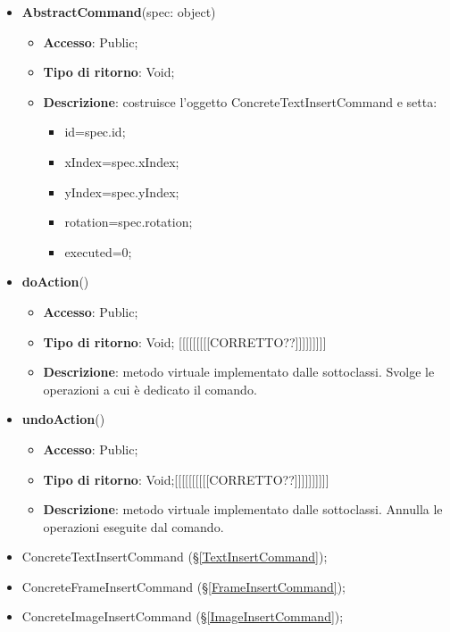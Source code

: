 {{{		
		\begin{itemize}
			\item \textbf{AbstractCommand}(spec: object)
			\begin{itemize}
				\item \textbf{Accesso}: Public;
				\item \textbf{Tipo di ritorno}: Void;
				\item \textbf{Descrizione}: costruisce l’oggetto ConcreteTextInsertCommand e setta:\\
				\begin{itemize}
				\item id=spec.id;
				\item xIndex=spec.xIndex;
				\item yIndex=spec.yIndex;
				\item rotation=spec.rotation;
				\item executed=0;
				\end{itemize}
			\end{itemize}
			\item \textbf{doAction}()
			\begin{itemize}
				\item \textbf{Accesso}: Public;
				\item \textbf{Tipo di ritorno}: Void; [[[[[[[[[CORRETTO??]]]]]]]]]
				\item \textbf{Descrizione}: metodo virtuale implementato dalle sottoclassi. Svolge le operazioni a cui è dedicato il comando.
			\end{itemize}
			\item \textbf{undoAction}()
			\begin{itemize}
				\item \textbf{Accesso}: Public;
				\item \textbf{Tipo di ritorno}: Void;[[[[[[[[[[CORRETTO??]]]]]]]]]]
				\item \textbf{Descrizione}: metodo virtuale implementato dalle sottoclassi. Annulla le operazioni eseguite dal comando.
			\end{itemize}
		\end{itemize}
		\begin{itemize}
			\item ConcreteTextInsertCommand (\S\ref{TextInsertCommand});
			\item ConcreteFrameInsertCommand (\S\ref{FrameInsertCommand});
			\item ConcreteImageInsertCommand (\S\ref{ImageInsertCommand});

\end{itemize}}}}
